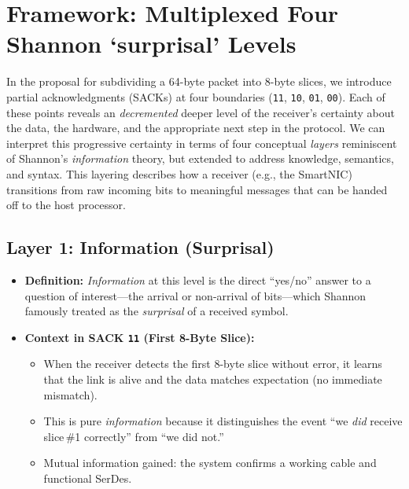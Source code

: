 \documentclass[../HFT-main.tex]{subfiles}
\begin{document}
%


\section*{Framework: Multiplexed Four Shannon `surprisal' Levels}

In the proposal for subdividing a 64-byte packet into 8-byte slices, we introduce partial acknowledgments (SACKs) at four boundaries (\texttt{11}, \texttt{10}, \texttt{01}, \texttt{00}). Each of these points reveals an \emph{decremented} deeper level of the receiver’s certainty about the data, the hardware, and the appropriate next step in the protocol. We can interpret this progressive certainty in terms of four conceptual \emph{layers} reminiscent of Shannon’s \emph{information} theory, but extended to address knowledge, semantics, and syntax. This layering describes how a receiver (e.g., the SmartNIC) transitions from raw incoming bits to meaningful messages that can be handed off to the host processor.

\subsection*{Layer 1: Information (Surprisal)}

\begin{itemize}
  \item \textbf{Definition:} \emph{Information} at this level is the direct ``yes/no'' answer to a question of interest---the arrival or non-arrival of bits---which Shannon famously treated as the \emph{surprisal} of a received symbol.
  \item \textbf{Context in SACK \texttt{11} (First 8-Byte Slice):}
  \begin{itemize}
    \item When the receiver detects the first 8-byte slice without error, it learns that the link is alive and the data matches expectation (no immediate mismatch).
    \item This is pure \emph{information} because it distinguishes the event ``we \emph{did} receive slice\,\#1 correctly'' from ``we did not.'' 
    \item Mutual information gained: the system confirms a working cable and functional SerDes.
  \end{itemize}
\end{itemize}
\end{document}
